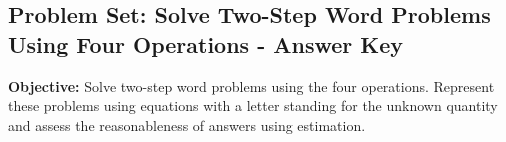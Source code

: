 \documentclass[11pt]{article}
\title{}
\date{}
\begin{document}
\subsection*{Problem Set: Solve Two-Step Word Problems Using Four Operations - Answer Key}
\onehalfspacing

\begin{tcolorbox}[colframe=black!40, colback=gray!5, 
coltitle=black, colbacktitle=black!20, fonttitle=\bfseries\Large, 
title=Learning Objective, halign title=center, left=5pt, right=5pt, top=5pt, bottom=15pt]
\textbf{Objective:} Solve two-step word problems using the four operations. Represent these problems using equations with a letter standing for the unknown quantity and assess the reasonableness of answers using estimation.
\end{tcolorbox}
\end{document}

